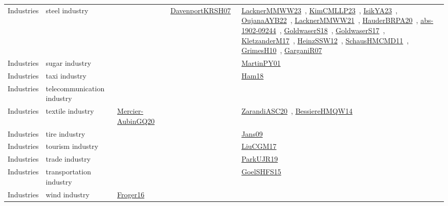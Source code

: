 {\begin{longtable}{lp{3cm}>{\raggedright\arraybackslash}p{6cm}>{\raggedright\arraybackslash}p{6cm}>{\raggedright\arraybackslash}p{8cm}}
Industries & steel industry &  & \href{../works/DavenportKRSH07.pdf}{DavenportKRSH07}~\cite{DavenportKRSH07} & \href{../works/LacknerMMWW23.pdf}{LacknerMMWW23}~\cite{LacknerMMWW23}, \href{../works/KimCMLLP23.pdf}{KimCMLLP23}~\cite{KimCMLLP23}, \href{../works/IsikYA23.pdf}{IsikYA23}~\cite{IsikYA23}, \href{../works/OujanaAYB22.pdf}{OujanaAYB22}~\cite{OujanaAYB22}, \href{../works/LacknerMMWW21.pdf}{LacknerMMWW21}~\cite{LacknerMMWW21}, \href{../works/HauderBRPA20.pdf}{HauderBRPA20}~\cite{HauderBRPA20}, \href{../works/abs-1902-09244.pdf}{abs-1902-09244}~\cite{abs-1902-09244}, \href{../works/GoldwaserS18.pdf}{GoldwaserS18}~\cite{GoldwaserS18}, \href{../works/GoldwaserS17.pdf}{GoldwaserS17}~\cite{GoldwaserS17}, \href{../works/KletzanderM17.pdf}{KletzanderM17}~\cite{KletzanderM17}, \href{../works/HeinzSSW12.pdf}{HeinzSSW12}~\cite{HeinzSSW12}, \href{../works/SchausHMCMD11.pdf}{SchausHMCMD11}~\cite{SchausHMCMD11}, \href{../works/GrimesH10.pdf}{GrimesH10}~\cite{GrimesH10}, \href{../works/GarganiR07.pdf}{GarganiR07}~\cite{GarganiR07}\\
Industries & sugar industry &  &  & \href{../works/MartinPY01.pdf}{MartinPY01}~\cite{MartinPY01}\\
Industries & taxi industry &  &  & \href{../works/Ham18.pdf}{Ham18}~\cite{Ham18}\\
Industries & telecommunication industry &  &  & \\
Industries & textile industry & \href{../works/Mercier-AubinGQ20.pdf}{Mercier-AubinGQ20}~\cite{Mercier-AubinGQ20} &  & \href{../works/ZarandiASC20.pdf}{ZarandiASC20}~\cite{ZarandiASC20}, \href{../works/BessiereHMQW14.pdf}{BessiereHMQW14}~\cite{BessiereHMQW14}\\
Industries & tire industry &  &  & \href{../works/Jans09.pdf}{Jans09}~\cite{Jans09}\\
Industries & tourism industry &  &  & \href{../works/LiuCGM17.pdf}{LiuCGM17}~\cite{LiuCGM17}\\
Industries & trade industry &  &  & \href{../works/ParkUJR19.pdf}{ParkUJR19}~\cite{ParkUJR19}\\
Industries & transportation industry &  &  & \href{../works/GoelSHFS15.pdf}{GoelSHFS15}~\cite{GoelSHFS15}\\
Industries & wind industry & \href{../works/Froger16.pdf}{Froger16}~\cite{Froger16} &  & \\
\end{longtable}
}


